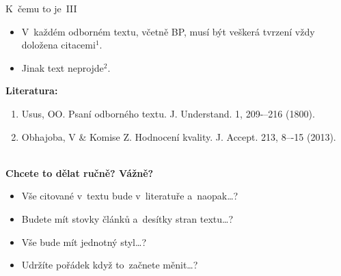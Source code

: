 \documentclass[compress, ucs, xelatex, 11pt, xcolor=svgnames, aspectratio=169,
	hyperref={
		bookmarks=true,
		unicode=true,
		colorlinks=true,
		pdftitle={Citacni software},
		plainpages=false,
		pdfauthor={Vojtech Zeisek},
		pdfsubject={Kratky uvod do citacniho software},
		pdfcreator={XeLaTeX},
		pdfkeywords={citace, reference, software, literatura},
		linkcolor=Crimson, %
		anchorcolor=Magenta, %
		citecolor=Magenta, %
		filecolor=Magenta, %
		menucolor=Magenta, %
		urlcolor=DarkTurquoise, %
		pdftex},
	url={hyphens, lowtilde} %
	]{beamer}
\begin{document}
\begin{frame}{K~čemu to je~III}
	\begin{itemize}
		\item V~každém odborném textu, včetně BP, musí být veškerá tvrzení vždy doložena citacemi$^{1}$.
		\item Jinak text neprojde$^{2}$.
	\end{itemize}
	\textbf{Literatura:}
	\begin{enumerate}
		\item Usus, OO. Psaní odborného textu. J. Understand. 1, 209-–216 (1800).
		\item Obhajoba, V \& Komise Z. Hodnocení kvality. J. Accept. 213, 8–-15 (2013).
	\end{enumerate}
	\hrulefill\\
	\textbf{Chcete to dělat ručně? Vážně?}
	\begin{itemize}
		\item Vše citované v~textu bude v~literatuře a~naopak\ldots?
		\item Budete mít stovky článků a~desítky stran textu\ldots?
		\item Vše bude mít jednotný styl\ldots?
		\item Udržíte pořádek když to~začnete měnit\ldots?
	\end{itemize}
\end{frame}
\end{document}
